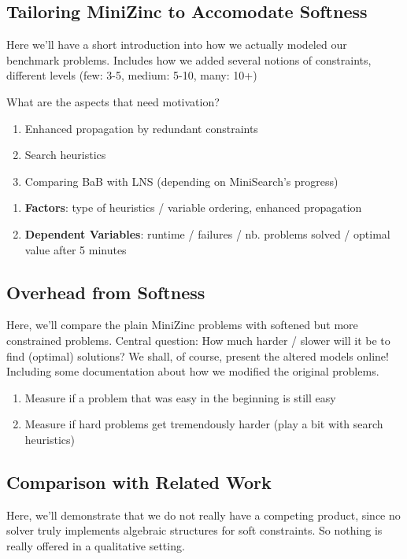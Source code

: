 \subsection{Tailoring MiniZinc to Accomodate Softness}
Here we'll have a short introduction into how we actually 
modeled our benchmark problems. Includes how we added several
notions of constraints, different levels (few: 3-5, medium: 5-10, many: 10+)

What are the aspects that need motivation?
\begin{enumerate}
\item Enhanced propagation by redundant constraints
\item Search heuristics
\item Comparing BaB with LNS (depending on MiniSearch's progress)
\end{enumerate}

\begin{enumerate}
\item \textbf{Factors}: type of heuristics / variable ordering, enhanced propagation
\item \textbf{Dependent Variables}: runtime / failures / nb. problems solved / optimal value after 5 minutes
\end{enumerate}

\subsection{Overhead from Softness}

Here, we'll compare the plain MiniZinc problems with softened but more constrained problems.
Central question: How much harder / slower will it be to find (optimal) solutions?
We shall, of course, present the altered models online! Including some documentation about
how we modified the original problems.

\begin{enumerate}
\item Measure if a problem that was easy in the beginning is still easy
\item Measure if hard problems get tremendously harder (play a bit with search heuristics)
\end{enumerate}

\subsection{Comparison with Related Work}

Here, we'll demonstrate that we do not really have a competing product, since no solver
truly implements algebraic structures for soft constraints. So nothing is
really offered in a qualitative setting.

